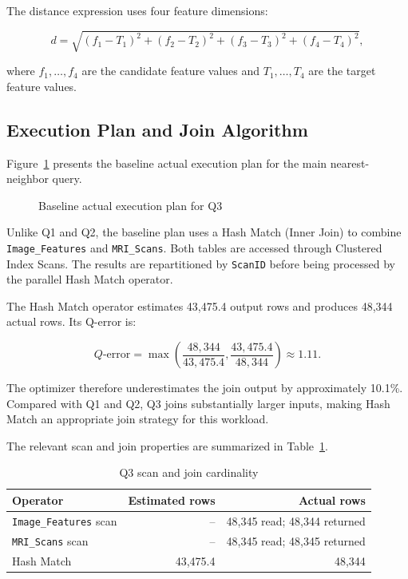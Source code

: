 The distance expression uses four feature dimensions:

\[
d=\sqrt{
(f_1-T_1)^2+
(f_2-T_2)^2+
(f_3-T_3)^2+
(f_4-T_4)^2
},
\]

where $f_1,\ldots,f_4$ are the candidate feature values and $T_1,\ldots,T_4$ are the target feature values.

\subsection{Execution Plan and Join Algorithm}

Figure~\ref{fig:q3-plan} presents the baseline actual execution plan for the main nearest-neighbor query.

\begin{figure}[htbp]
\centering
{}
\caption{Baseline actual execution plan for Q3}
\label{fig:q3-plan}
\end{figure}

Unlike Q1 and Q2, the baseline plan uses a Hash Match (Inner Join) to combine \texttt{Image\_Features} and \texttt{MRI\_Scans}. Both tables are accessed through Clustered Index Scans. The results are repartitioned by \texttt{ScanID} before being processed by the parallel Hash Match operator.

The Hash Match operator estimates 43,475.4 output rows and produces 48,344 actual rows. Its Q-error is:

\[
Q\text{-error}=
\max\left(
\frac{48,344}{43,475.4},
\frac{43,475.4}{48,344}
\right)
\approx 1.11.
\]

The optimizer therefore underestimates the join output by approximately 10.1\%. Compared with Q1 and Q2, Q3 joins substantially larger inputs, making Hash Match an appropriate join strategy for this workload.

The relevant scan and join properties are summarized in Table~\ref{tab:q3-cardinality}.

\begin{table}[htbp]
\centering
\caption{Q3 scan and join cardinality}
\label{tab:q3-cardinality}
\begin{tabular}{lrr}
\toprule
Operator & Estimated rows & Actual rows \\
\midrule
\texttt{Image\_Features} scan & -- & 48,345 read; 48,344 returned \\
\texttt{MRI\_Scans} scan & -- & 48,345 read; 48,345 returned \\
Hash Match & 43,475.4 & 48,344 \\
\bottomrule
\end{tabular}
\end{table}

